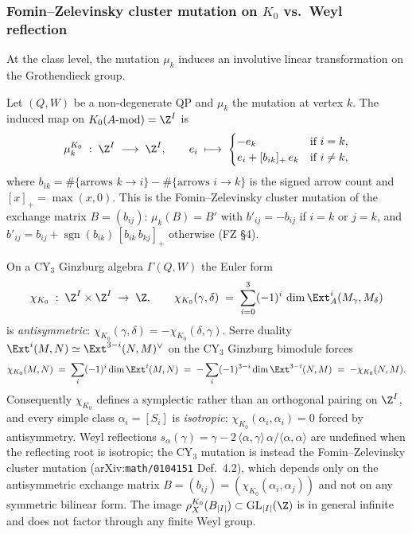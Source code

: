 \subsubsection{Fomin--Zelevinsky cluster mutation on $K_0$ vs.\ Weyl
reflection}
\label{sec:fz-vs-weyl}

At the class level, the mutation $\mu_k$ induces an involutive linear
transformation on the Grothendieck group.

\begin{proposition}
\label{prop:fz-mutation-K0}
Let $(Q, W)$ be a non-degenerate QP and $\mu_k$
the mutation at vertex $k$. The induced map on
$K_0(A\text{-}\mathrm{mod}) = \Z^{I}$ is
\[
 \mu_k^{K_0} \;:\; \Z^{I} \;\longrightarrow\; \Z^{I}, \qquad
 e_i \;\longmapsto\;
 \begin{cases}
 -e_k & \text{if } i = k, \\
 e_i + [b_{ik}]_{+}\, e_k & \text{if } i \neq k,
 \end{cases}
\]
where $b_{ik} = \#\{\text{arrows } k \to i\} - \#\{\text{arrows } i \to k\}$
is the signed arrow count and $[x]_{+} = \max(x, 0)$. This is the
Fomin--Zelevinsky cluster mutation of the exchange matrix $B = (b_{ij})$:
$\mu_k(B) = B'$ with $b'_{ij} = -b_{ij}$ if $i = k$ or $j = k$, and
$b'_{ij} = b_{ij} + \operatorname{sgn}(b_{ik}) \, [b_{ik}\, b_{kj}]_{+}$
otherwise (FZ \S4).
\end{proposition}

\begin{proposition}
\label{prop:fz-not-weyl-on-cy3}
On a CY$_3$ Ginzburg algebra $\Gamma(Q, W)$ the
Euler form
\[
 \chi_{K_0} \;:\; \Z^{I} \times \Z^{I} \;\to\; \Z, \qquad
 \chi_{K_0}(\gamma, \delta) \;=\; \sum_{i = 0}^{3} (-1)^{i}\,
 \dim \Ext^{i}_{A}(M_\gamma, M_\delta)
\]
is \emph{antisymmetric}: $\chi_{K_0}(\gamma, \delta) = -\chi_{K_0}(\delta,
\gamma)$. Serre duality
$\Ext^{i}(M, N) \simeq \Ext^{3 - i}(N, M)^{\vee}$ on the CY$_3$ Ginzburg
bimodule forces
\[
\chi_{K_0}(M, N) \;=\;\sum_{i} (-1)^{i} \dim \Ext^{i}(M, N)
 \;=\; -\sum_{i} (-1)^{3 - i} \dim \Ext^{3 - i}(N, M) \;=\; -\chi_{K_0}(N, M).
\]
Consequently $\chi_{K_0}$ defines a symplectic rather than an orthogonal
pairing on $\Z^{I}$, and every simple class $\alpha_i = [S_i]$ is
\emph{isotropic}: $\chi_{K_0}(\alpha_i, \alpha_i) = 0$ forced by
antisymmetry. Weyl reflections $s_{\alpha}(\gamma) = \gamma - 2\,
\langle \alpha, \gamma\rangle\, \alpha / \langle \alpha, \alpha\rangle$
are undefined when the reflecting root is isotropic; the CY$_3$
mutation is instead the Fomin--Zelevinsky cluster mutation
(arXiv:\texttt{math/0104151} Def.~4.2), which depends only on the
antisymmetric exchange matrix $B = (b_{ij}) = (\chi_{K_0}(\alpha_i,
\alpha_j))$ and not on any symmetric bilinear form. The image
$\rho_X^{K_0}(B_{|I|}) \subset \mathrm{GL}_{|I|}(\Z)$ is in general
infinite and does not factor through any finite Weyl group.
\end{proposition}

